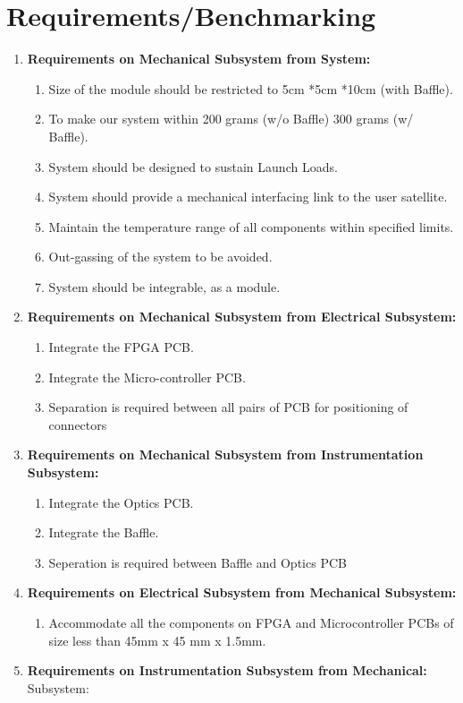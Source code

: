 \documentclass[../../main.tex]{subfiles}
\begin{document}
\section{Requirements/Benchmarking}
\begin{enumerate}
    
    \item \textbf{Requirements on Mechanical Subsystem from System:}
    \begin{enumerate}
        \item Size of the module should be restricted to 5cm *5cm *10cm (with Baffle).
        \item To make our system within 200 grams (w/o Baffle) 300 grams (w/ Baffle).
        \item System should be designed to sustain Launch Loads.
        \item System should provide a mechanical interfacing link to the user satellite.
        \item Maintain the temperature range of all components within specified limits.
        \item Out-gassing of the system to be avoided.
        \item System should be integrable, as a module.
    \end{enumerate}
    \item \textbf{Requirements on Mechanical Subsystem from Electrical Subsystem:}
    \begin{enumerate}
        \item Integrate the FPGA PCB.
        \item Integrate the Micro-controller PCB.
        \item Separation is required between all pairs of PCB for positioning of connectors
    \end{enumerate}
    \item \textbf{Requirements on Mechanical Subsystem from Instrumentation Subsystem:}
    \begin{enumerate}
        \item Integrate the Optics PCB.
        \item Integrate the Baffle.
        \item Seperation is required between Baffle and Optics PCB
    \end{enumerate} 
    \item \textbf{Requirements on Electrical Subsystem from Mechanical Subsystem:}
    \begin{enumerate}
        \item Accommodate all the components on FPGA and Microcontroller PCBs of size less than 45mm x 45 mm x 1.5mm. 
    \end{enumerate}
    \item \textbf{Requirements on Instrumentation Subsystem from Mechanical:} Subsystem:
    \begin{enumerate}


\end{enumerate}
\end{enumerate}
\end{document}
